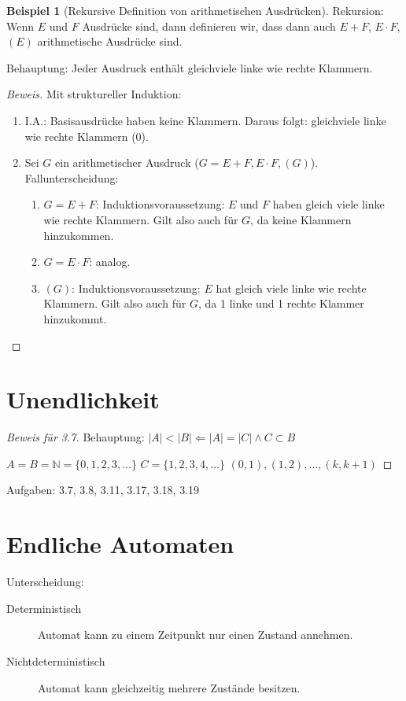 \documentclass[11pt]{article} %
\theoremstyle{definition}
\newtheorem*{beispiel}{Beispiel}
\begin{document}
\begin{description}
\begin{beispiel}[Rekursive Definition von arithmetischen Ausdrücken]
Rekursion: Wenn $E$ und $F$ Ausdrücke sind, dann definieren wir, dass dann auch $E+F$, $E\cdot F$, $(E)$ arithmetische Ausdrücke sind.

Behauptung: Jeder Ausdruck enthält gleichviele linke wie rechte Klammern.
\end{beispiel}

\begin{proof}[Beweis] Mit struktureller Induktion:

\begin{enumerate}
\item I.A.: Basisausdrücke haben keine Klammern. Daraus folgt: gleichviele linke wie rechte Klammern (0).
\item Sei $G$ ein arithmetischer Ausdruck ($G = E+F, E\cdot F, (G)$). Fallunterscheidung:
\begin{enumerate}
\item $G=E+F$: Induktionsvoraussetzung: $E$ und $F$ haben gleich viele linke wie rechte Klammern. Gilt also auch für $G$, da keine Klammern hinzukommen.
\item $G=E\cdot F$: analog.
\item $(G)$: Induktionsvoraussetzung: $E$ hat gleich viele linke wie rechte Klammern. Gilt also auch für $G$, da 1 linke und 1 rechte Klammer hinzukommt.
\end{enumerate}
\end{enumerate}
\end{proof}

\end{description}

\section{Unendlichkeit}

\begin{proof}[Beweis für 3.7]
Behauptung: $|A| < |B| \Leftarrow |A| = |C| \land C \subset B$

$A = B = \mathbb{N} = \{0,1,2,3,\dots\}$
$C = \{1,2,3,4,\dots\}$
$(0,1), (1,2), \dots, (k,k+1)$
\end{proof}

Aufgaben: 3.7, 3.8, 3.11, 3.17, 3.18, 3.19

\section{Endliche Automaten}

Unterscheidung:
\begin{description}
\item[Deterministisch] Automat kann zu einem Zeitpunkt nur einen Zustand annehmen.
\item[Nichtdeterministisch] Automat kann gleichzeitig mehrere Zustände besitzen.
\end{description}
\end{document}
